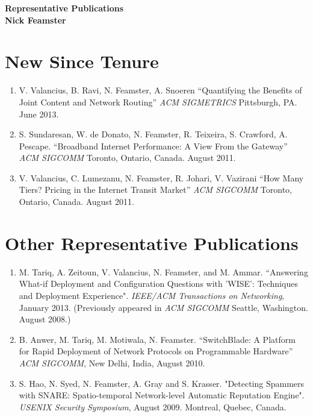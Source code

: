 \newpage \setcounter{page}{1}

\begin{center}
{\Large\textbf{Representative Publications}}\\[0.1in] {\large\textbf{Nick
Feamster}}\\
\end{center}

\section*{New Since Tenure}
\begin{enumerate}
\item V. Valancius, B. Ravi, N. Feamster, A. Snoeren
``Quantifying the Benefits of Joint Content and Network Routing''
{\em ACM SIGMETRICS}
Pittsburgh, PA. June 2013.

\item S. Sundaresan, W. de Donato, N. Feamster, R. Teixeira,
S. Crawford, A. Pescape. ``Broadband Internet Performance: A View From
the Gateway'' {\em ACM SIGCOMM} Toronto, Ontario, Canada. August 2011. 

\item V. Valancius, C. Lumezanu, N. Feamster, R. Johari, V. Vazirani
``How Many Tiers? Pricing in the Internet Transit Market''
{\em ACM SIGCOMM}
Toronto, Ontario, Canada. August 2011. 
\end{enumerate}


\section*{Other Representative Publications}
\begin{enumerate}
\item M. Tariq, A. Zeitoun, V. Valancius, N. Feamster, and
M. Ammar. ``Answering What-if Deployment and Configuration Questions
with 'WISE': Techniques and Deployment Experience". {\em IEEE/ACM
Transactions on Networking}, January 2013. 
(Previously appeared in {\em ACM SIGCOMM} Seattle, Washington. August 2008.)

\item B. Anwer, M. Tariq, M. Motiwala, N. Feamster. ``SwitchBlade: A Platform
for Rapid Deployment of Network Protocols on Programmable Hardware''
{\em ACM SIGCOMM}, New Delhi, India, August 2010.

\item S. Hao, N. Syed, N. Feamster, A. Gray and S. Krasser. "Detecting
Spammers with SNARE: Spatio-temporal Network-level Automatic Reputation
Engine". {\em USENIX Security Symposium}, August 2009. Montreal, Quebec,
Canada. 
\end{enumerate}
